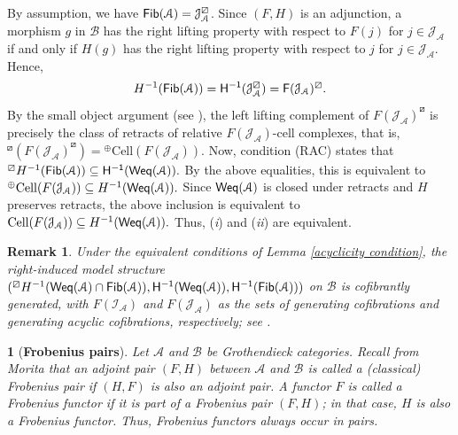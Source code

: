 \documentclass[12pt,twoside]{amsart}
\theoremstyle{bfupright head,slanted body}
\theoremstyle{bfupright head,upright body}
\newtheorem{bfhpg}[res]{}               \newtheorem*{bfhpg*}{}
\theoremstyle{fixed bf head,slanted body}
\theoremstyle{fixed bf head,upright body}
\newtheorem{rmk}[res]{Remark}           \newtheorem*{rmk*}{Remark}
\theoremstyle{numbered paragraph}
\newcounter{eqc}
\newenvironment{prf*}[1][Proof]{%
  \begin{proof}[\bf #1]
    \setcounter{equation}{0}
    \renewcommand{\theequation}{\arabic{equation}}}
  {\end{proof}
}
\newcommand{\eqclbl}[1]{{\upshape(\textit{#1})}}
\numberwithin{equation}{res}
\newcommand{\calA}{\mathcal{A}}
\newcommand{\calB}{\mathcal{B}}
\newcommand{\Fib}{\sf{Fib}}
\newcommand{\Weq}{\sf{Weq}}
\begin{document}
\begin{prf*}
By assumption, we have \(\Fib(\mathcal A)=\mathcal J_{\mathcal A}^{\boxslash}\). Since \((F,H)\) is an adjunction, a morphism \(g\) in \(\mathcal B\) has the right lifting property with respect to \(F(j)\) for \(j\in\mathcal J_{\mathcal A}\) if and only if \(H(g)\) has the right lifting property with respect to \(j\) for \(j\in\mathcal J_{\mathcal A}\). Hence,
\[
H^{-1}(\Fib(\mathcal A)) = H^{-1}(\mathcal J_{\mathcal A}^{\boxslash}) = F(\mathcal J_{\mathcal A})^{\boxslash}.
\]
By the small object argument (see \cite[Theorem 2.1.14]{Hovey1999}), the left lifting complement of \(F(\mathcal J_{\mathcal A})^{\boxslash}\) is precisely the class of retracts of relative \(F(\mathcal J_{\mathcal A})\)-cell complexes, that is,
\(
{}^{\boxslash}(F(\mathcal J_{\mathcal A})^{\boxslash}) = {^{\oplus}\mathrm{Cell}(F(\mathcal J_{\mathcal A}))}.
\)
Now, condition (RAC) states that
\(
{}^{\boxslash}H^{-1}(\Fib(\mathcal A)) \subseteq H^{-1}(\Weq(\mathcal A)).
\)
By the above equalities, this is equivalent to
\(
^{\oplus}\mathrm{Cell}(F(\mathcal J_{\mathcal A})) \subseteq H^{-1}(\Weq(\mathcal A)).
\)
Since \(\Weq(\mathcal A)\) is closed under retracts and \(H\) preserves retracts, the above inclusion is equivalent to
\(
\mathrm{Cell}(F(\mathcal J_{\mathcal A})) \subseteq H^{-1}(\Weq(\mathcal A)).
\)
Thus, \eqclbl{i} and \eqclbl{ii} are equivalent.
\end{prf*}

\begin{rmk}\label{cofibrantly generated}
Under the equivalent conditions of Lemma \ref{acyclicity condition}, the right-induced model structure
\((^{\boxslash}H^{-1}(\Weq(\mathcal A)\cap\Fib(\mathcal A)),H^{-1}(\Weq(\mathcal A)),H^{-1}(\Fib(\mathcal A)))\)
on \(\mathcal B\) is cofibrantly generated, with \(F(\mathcal I_{\mathcal A})\) and \(F(\mathcal J_{\mathcal A})\) as the sets of generating cofibrations and generating acyclic cofibrations, respectively; see \cite[Theorem 11.3.2]{HPS2003}.
\end{rmk}

\begin{bfhpg}[\bf Frobenius pairs]\label{def of Frobenius pairs}
Let \(\calA\) and \(\calB\) be Grothendieck categories.
Recall from Morita \cite{Morita65} that an adjoint pair \((F,H)\) between \(\calA\) and \(\calB\) is called a (classical) \emph{Frobenius pair} if \((H,F)\) is also an adjoint pair.
A functor \(F\) is called a \emph{Frobenius functor} if it is part of a Frobenius pair \((F,H)\); in that case, \(H\) is also a Frobenius functor. Thus, Frobenius functors always occur in pairs.
\end{bfhpg}
\end{document}
